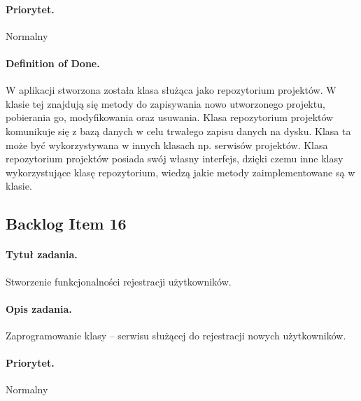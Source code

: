 ﻿\documentclass[a4paper]{article}
\begin{document}
\paragraph{Priorytet.} Normalny
\paragraph{Definition of Done.} W aplikacji stworzona została klasa służąca jako repozytorium projektów. W klasie tej znajdują się metody do zapisywania nowo utworzonego projektu, pobierania go, modyfikowania oraz usuwania. Klasa repozytorium projektów komunikuje się z bazą danych w celu trwałego zapisu danych na dysku. Klasa ta może być wykorzystywana w innych klasach np. serwisów projektów. Klasa repozytorium projektów posiada swój własny interfejs, dzięki czemu inne klasy wykorzystujące klasę repozytorium, wiedzą jakie metody zaimplementowane są w klasie.

\subsection{Backlog Item 16} 
\paragraph{Tytuł zadania.} Stworzenie funkcjonalności rejestracji użytkowników. 
\paragraph{Opis zadania.} Zaprogramowanie klasy -- serwisu służącej do rejestracji nowych użytkowników. 
\paragraph{Priorytet.} Normalny
\end{document}
